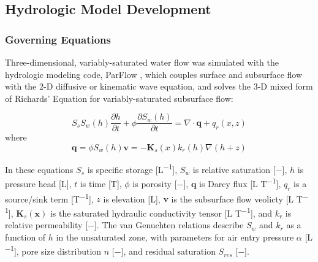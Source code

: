 \subsection{Hydrologic Model Development} \label{ssec:MM_parflow_model}
\subsubsection{Governing Equations} \label{sssec:gov_eqn}
Three-dimensional, variably-saturated water flow was simulated with the hydrologic modeling code, ParFlow \citep{ashby1996parallel,jones2001newton,kollet2006integrated}, which couples surface and subsurface flow with the 2-D diffusive or kinematic wave equation, and solves the 3-D mixed form of Richards' Equation for variably-saturated subsurface flow: 

\begin{equation}
S_s S_w(h) \frac{\partial h}{\partial t} + \phi \frac{\partial S_w(h)}{\partial t} 
= \nabla \cdot \textbf{q}+ q_r(x,z)
\label{richards_eqn1}
\end{equation}
\noindent where
\begin{equation}
\textbf{q}
= \phi S_w (h) \textbf{v}
= -\textbf{K}_s (x) k_r (h) \nabla (h+z)
\label{richards_eqn2}
\end{equation}

\noindent In these equations $S_s$ is specific storage [L\textsuperscript{$-$1}], $S_w$ is relative saturation [$-$], $h$ is pressure head [L], $t$ is time [T], $\phi$ is porosity [$-$], $\textbf{q}$ is Darcy flux [L T\textsuperscript{$-$1}], $q_r$ is a source/sink term [T\textsuperscript{$-$1}], $z$ is elevation [L], $\textbf{v}$ is the subsurface flow veolicty [L T\textsuperscript{$-$1}], $\textbf{K}_s(\textbf{x})$ is the saturated hydraulic conductivity tensor [L T\textsuperscript{$-$1}], and $k_r$ is relative permeability [$-$]. The van Genuchten relations \citep{vangenuchten1980} describe $S_w$ and $k_r$ as a function of $h$ in the unsaturated zone, with parameters for air entry pressure $\alpha$ [L\textsuperscript{$-$1}], pore size distribution $n$ [$-$], and residual saturation $S_{res}$ [$-$].

